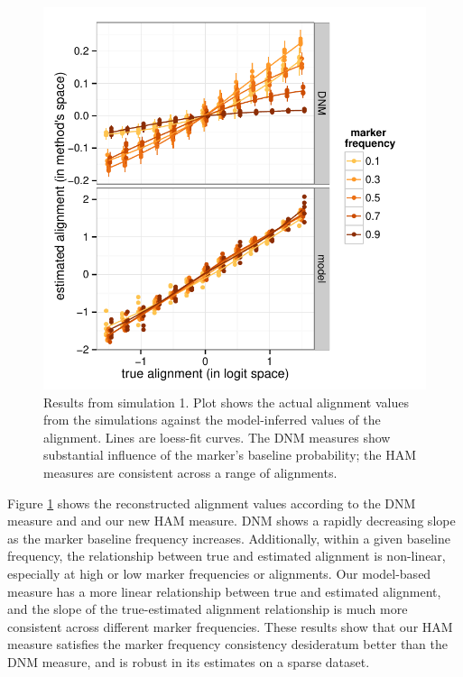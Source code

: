 \documentclass{acm_proc_article-sp}
\begin{document}
\begin{figure}[t]
\centering
\includegraphics[width=\columnwidth]{graphics/www2016_simulation1_crossiter.pdf}
\caption{Results from simulation 1. Plot shows the actual alignment values from the simulations against the model-inferred values of the alignment. Lines are loess-fit curves. The DNM measures show substantial influence of the marker's baseline probability; the HAM measures are consistent across a range of alignments.}\label{fig:sim1}
\end{figure}

Figure \ref{fig:sim1} shows the reconstructed alignment values according to the DNM measure and and our new HAM measure. DNM shows a rapidly decreasing slope as the marker baseline frequency increases.  Additionally, within a given baseline frequency, the relationship between true and estimated alignment is non-linear, especially at high or low marker frequencies or alignments.  Our model-based measure has a more linear relationship between true and estimated alignment, and the slope of the true-estimated alignment relationship is much more consistent across different marker frequencies.  These results show that our HAM measure satisfies the marker frequency consistency desideratum better than the DNM measure, and is robust in its estimates on a sparse dataset.
\end{document}
